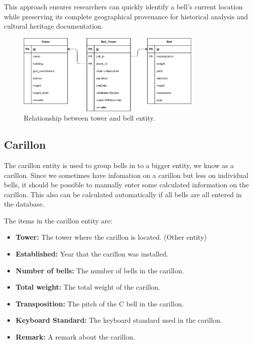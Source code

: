 \documentclass[11pt, a4paper]{article}
\begin{document}
This approach ensures researchers can quickly identify a bell's current location while preserving its complete geographical provenance for historical analysis and cultural heritage documentation.

\begin{figure}[h!]
    \centering
    \includegraphics[width=0.8\textwidth]{images/tower_bell.png}
    \caption{Relationship between tower and bell entity.}
    \label{fig:tower_bell-relation}
\end{figure}

\subsection{Carillon}

The carillon entity is used to group bells in to a bigger entity, we know as a carillon. Since we sometimes have infomation on a carillon but less on individual bells,
it should be possible to manually enter some calculated information on the carillon.
This also can be calculated automatically if all bells are all entered in the database. 

The items in the carillon entity are:

\begin{itemize}
    \item \textbf{Tower:} The tower where the carillon is located. (Other entity)
    \item \textbf{Established:} Year that the carillon was installed.
    \item \textbf{Number of bells:} The number of bells in the carillon.
    \item \textbf{Total weight:} The total weight of the carillon.
    \item \textbf{Transposition:} The pitch of the C bell in the carillon.
    \item \textbf{Keyboard Standard:} The keyboard standard used in the carillon.
    \item \textbf{Remark:} A remark about the carillon.
\end{itemize}
\end{document}
